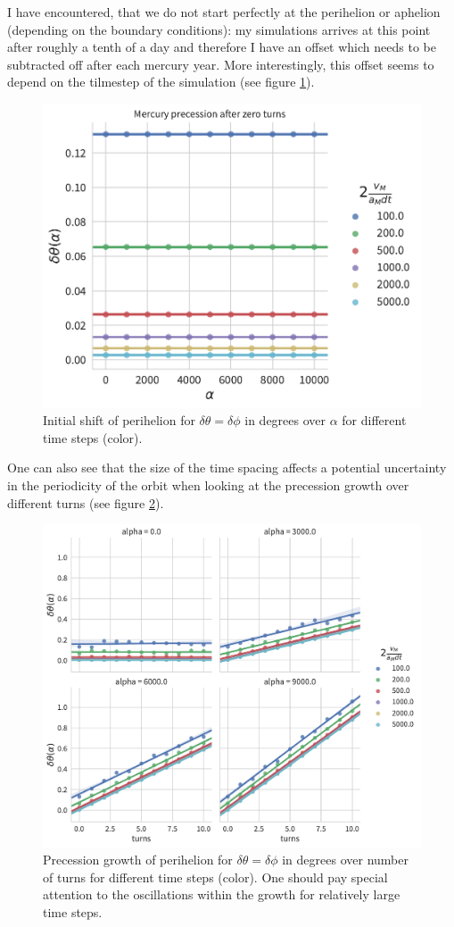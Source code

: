 \documentclass[12pt]{iopart}
\begin{document}
I have encountered, that we do not start perfectly at the perihelion or aphelion (depending on the boundary conditions): my simulations arrives at this point after roughly a tenth of a day and therefore I have an offset which needs to be subtracted off after each mercury year.
More interestingly, this offset seems to depend on the tilmestep of the simulation (see figure \ref{fcc2}).
\begin{figure}[htb]
	\centering
	\includegraphics[width=.4\textwidth]{figs/initial_time_shift.pdf}
	\caption{\label{fcc2}Initial shift of perihelion for $\delta\theta = \delta\phi$ in degrees over $\alpha$ for different time steps (color).}
\end{figure}

One can also see that the size of the time spacing affects a potential uncertainty in the periodicity of the orbit when looking at the precession growth over different turns (see figure \ref{fcc3}).
\begin{figure}[htb]
	\centering
	\includegraphics[width=.7\textwidth]{figs/precession_growth.pdf}
	\caption{\label{fcc3}Precession growth of perihelion for $\delta\theta = \delta\phi$ in degrees over number of turns for different time steps (color).  One should pay special attention to the oscillations within the growth for relatively large time steps.}
\end{figure}
\end{document}
